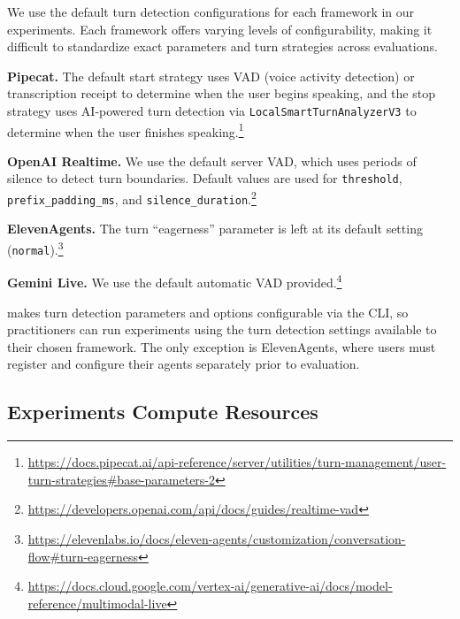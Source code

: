 We use the default turn detection configurations for each framework in our experiments. Each framework offers varying levels of configurability, making it difficult to standardize exact parameters and turn strategies across evaluations.

\textbf{Pipecat.} The default start strategy uses VAD (voice activity detection) or transcription receipt to determine when the user begins speaking, and the stop strategy uses AI-powered turn detection via \texttt{LocalSmartTurnAnalyzerV3} to determine when the user finishes speaking.\footnote{\url{https://docs.pipecat.ai/api-reference/server/utilities/turn-management/user-turn-strategies\#base-parameters-2}}

\textbf{OpenAI Realtime.} We use the default server VAD, which uses periods of silence to detect turn boundaries. Default values are used for \texttt{threshold}, \texttt{prefix\_padding\_ms}, and \texttt{silence\_duration}.\footnote{\url{https://developers.openai.com/api/docs/guides/realtime-vad}}

\textbf{ElevenAgents.} The turn ``eagerness'' parameter is left at its default setting (\texttt{normal}).\footnote{\url{https://elevenlabs.io/docs/eleven-agents/customization/conversation-flow\#turn-eagerness}}

\textbf{Gemini Live.} We use the default automatic VAD provided.\footnote{\url{https://docs.cloud.google.com/vertex-ai/generative-ai/docs/model-reference/multimodal-live}}

\framework{} makes turn detection parameters and options configurable via the CLI, so practitioners can run experiments using the turn detection settings available to their chosen framework. The only exception is ElevenAgents, where users must register and configure their agents separately prior to evaluation.



\subsection{Experiments Compute Resources}
\label{app:compute-resources}

